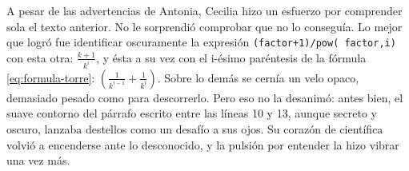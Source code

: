     A pesar de las advertencias de Antonia, Cecilia hizo un esfuerzo
    por comprender sola el texto anterior. No le sorprendió comprobar
    que no lo conseguía. Lo mejor que logró fue identificar
    oscuramente la expresión \lstinline!(factor+1)/pow( factor,i)! con
    esta otra: $\frac{k+1}{k^i}$, y ésta a su vez con el i-ésimo
    paréntesis de la fórmula \eqref{eq:formula-torre}:
    $\left( \frac{1}{k^{i-1}} + \frac{1}{k^{i}} \right)$. Sobre lo
    demás se cernía un velo opaco, demasiado pesado como para
    descorrerlo. Pero eso no la desanimó: antes bien, el suave
    contorno del párrafo escrito entre las líneas 10 y 13, aunque
    secreto y oscuro, lanzaba destellos como un desafío a sus ojos. Su
    corazón de científica volvió a encenderse ante lo desconocido, y
    la pulsión por entender la hizo vibrar una vez más.


